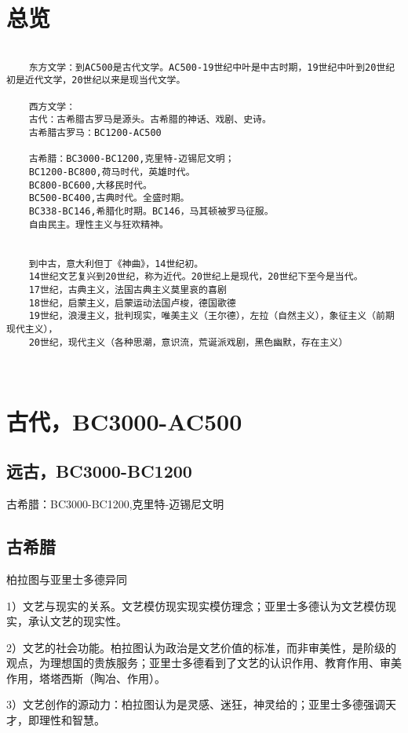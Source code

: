 \documentclass[UTF8]{../RepresentationUniverse}
\begin{document}
\chapter{总览}



\begin{lstlisting}

    东方文学：到AC500是古代文学。AC500-19世纪中叶是中古时期，19世纪中叶到20世纪初是近代文学，20世纪以来是现当代文学。

    西方文学：
    古代：古希腊古罗马是源头。古希腊的神话、戏剧、史诗。
    古希腊古罗马：BC1200-AC500
    
    古希腊：BC3000-BC1200,克里特-迈锡尼文明；
    BC1200-BC800,荷马时代，英雄时代。
    BC800-BC600,大移民时代。
    BC500-BC400,古典时代。全盛时期。
    BC338-BC146,希腊化时期。BC146，马其顿被罗马征服。
    自由民主。理性主义与狂欢精神。
    
    
    到中古，意大利但丁《神曲》，14世纪初。
    14世纪文艺复兴到20世纪，称为近代。20世纪上是现代，20世纪下至今是当代。
    17世纪，古典主义，法国古典主义莫里哀的喜剧
    18世纪，启蒙主义，启蒙运动法国卢梭，德国歌德
    19世纪，浪漫主义，批判现实，唯美主义（王尔德），左拉（自然主义），象征主义（前期现代主义），
    20世纪，现代主义（各种思潮，意识流，荒诞派戏剧，黑色幽默，存在主义）
    
    
\end{lstlisting}




\chapter{古代，BC3000-AC500}

\section{远古，BC3000-BC1200}

古希腊：BC3000-BC1200,克里特-迈锡尼文明


\section{古希腊}

\begin{proposition}
    柏拉图与亚里士多德异同

    1）文艺与现实的关系。文艺模仿现实现实模仿理念；亚里士多德认为文艺模仿现实，承认文艺的现实性。
    
    2）文艺的社会功能。柏拉图认为政治是文艺价值的标准，而非审美性，是阶级的观点，为理想国的贵族服务；亚里士多德看到了文艺的认识作用、教育作用、审美作用，塔塔西斯（陶冶、作用）。
    
    3）文艺创作的源动力：柏拉图认为是灵感、迷狂，神灵给的；亚里士多德强调天才，即理性和智慧。
\end{proposition}
\end{document}
